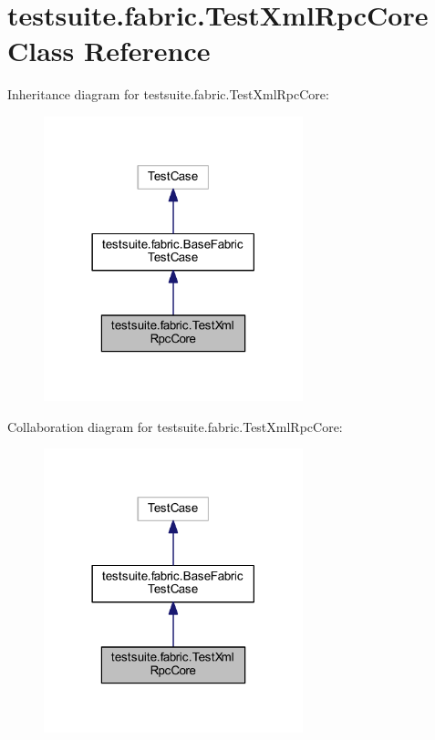 \hypertarget{classtestsuite_1_1fabric_1_1_test_xml_rpc_core}{}\section{testsuite.\+fabric.\+Test\+Xml\+Rpc\+Core Class Reference}
\label{classtestsuite_1_1fabric_1_1_test_xml_rpc_core}


Inheritance diagram for testsuite.\+fabric.\+Test\+Xml\+Rpc\+Core\+:
\nopagebreak
\begin{figure}[H]
\begin{center}
\leavevmode
\includegraphics[width=213pt]{classtestsuite_1_1fabric_1_1_test_xml_rpc_core__inherit__graph}
\end{center}
\end{figure}


Collaboration diagram for testsuite.\+fabric.\+Test\+Xml\+Rpc\+Core\+:
\nopagebreak
\begin{figure}[H]
\begin{center}
\leavevmode
\includegraphics[width=213pt]{classtestsuite_1_1fabric_1_1_test_xml_rpc_core__coll__graph}
\end{center}
\end{figure}
